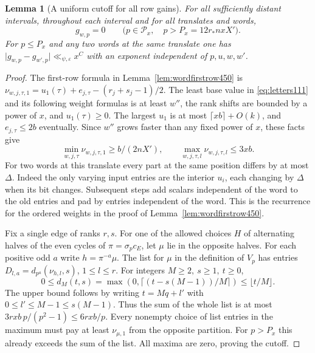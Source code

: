 \documentclass[a4paper,11pt]{article}
\newtheorem{lemma}[proposition]{Lemma}
\theoremstyle{definition}
\theoremstyle{remark}
\numberwithin{equation}{section}
\begin{document}
\begin{lemma}[A uniform cutoff for all row gains]\leavevmode
\label{lem:rowcut510}
For all sufficiently distant intervals, throughout each interval
and for all translates and words,
\[
     g_{w,p}=0\qquad
        \bigl(p\in\mathcal P_x,\quad p>P_x=12r_*nxX'\bigr).
\]
For \(p\le P_x\) and any two words at the same translate one has
\(\lvert g_{w,p}-g_{w',p}\rvert\ll_{\psi,\varepsilon}x^C\)
with an exponent independent of \(p,u,w,w'\).
\end{lemma}
\begin{proof}
The first-row formula in Lemma~\ref{lem:wordfirstrow450} is
\(\nu_{w,j,\tau,1}=u_1(\tau)+e_{j,\tau}-(r_j+s_j-1)/2\).
The least base value in \eqref{eq:letters111} and its following
weight formulas is at least \(w''\), the rank shifts are bounded
by a power of \(x\), and \(u_1(\tau)\ge0\). The largest \(u_1\)
is at most \(\lceil xb\rceil+O(k)\), and \(e_{j,\tau}\le2b\)
eventually. Since \(w''\) grows faster than any fixed power of
\(x\), these facts give
\[
   \min_{w,j,\tau}\nu_{w,j,\tau,1}\ge b/(2nX'),
           \qquad \max_{w,j,\tau,l}\nu_{w,j,\tau,l}\le 3xb .
\]
For two words at this translate every part at the same position
differs by at most \(\Delta\). Indeed the only varying input
entries are the interior \(u_i\), each changing by \(\Delta\)
when its bit changes. Subsequent steps add scalars independent
of the word to the old entries and pad by entries independent
of the word. This is the recurrence for the ordered weights
in the proof of Lemma~\ref{lem:wordfirstrow450}.

Fix a single edge of ranks \(r,s\). For one of the allowed
choices \(H\) of alternating halves of the even cycles of
\(\pi=\sigma_p c_E\), let \(\mu\) lie in the opposite halves.
For each positive odd \(a\) write \(h=\pi^{-a}\mu\). The
list for \(\mu\) in the definition of \(V_p\) has entries
\(D_{l,a}=d_{p^a}(\nu_{h,l},s)\), \(1\le l\le r\).
For integers \(M\ge2,\ s\ge1,\ t\ge0\),
\[
       0\le d_M(t,s)=\max(0,\lceil(t-s(M-1))/M\rceil)
                           \le\lfloor t/M\rfloor .
\]
The upper bound follows by writing \(t=Mq+l'\) with
\(0\le l'\le M-1\le s(M-1)\). Thus the sum of the whole
list is at most \(3rxb\,p/(p^2-1)\le 6rxb/p\).
Every nonempty choice of list entries in the maximum must pay
at least \(\nu_{\mu,1}\) from the opposite partition. For
\(p>P_x\) this already exceeds the sum of the list. All
maxima are zero, proving the cutoff.


\end{proof}
\end{document}

